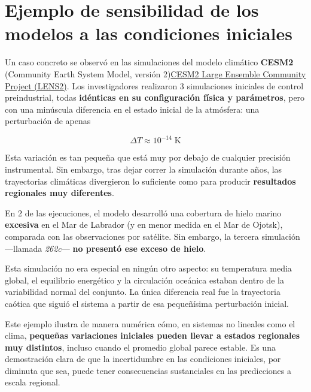 \documentclass[
  10pt,
  a4paper,
  DIV=11,
  numbers=noendperiod,
  open=any]{scrreprt}
\numberwithin{equation}{chapter}
\numberwithin{equation}{chapter}
\renewcommand{\[}{\begin{equation}}
\renewcommand{\]}{\end{equation}}
\begin{document}
\section{Ejemplo de sensibilidad de los modelos a las condiciones
iniciales}\label{ejemplo-de-sensibilidad-de-los-modelos-a-las-condiciones-iniciales}

Un caso concreto se observó en las simulaciones del modelo climático
\textbf{CESM2} (Community Earth System Model, versión
2)\href{https://www.cesm.ucar.edu/community-projects/lens2}{CESM2 Large
Ensemble Community Project (LENS2)}. Los investigadores realizaron 3
simulaciones iniciales de control preindustrial, todas \textbf{idénticas
en su configuración física y parámetros}, pero con una minúscula
diferencia en el estado inicial de la atmósfera: una perturbación de
apenas

\begin{equation}

\Delta T \approx 10^{-14} \; \text{K}

\end{equation}

Esta variación es tan pequeña que está muy por debajo de cualquier
precisión instrumental. Sin embargo, tras dejar correr la simulación
durante años, las trayectorias climáticas divergieron lo suficiente como
para producir \textbf{resultados regionales muy diferentes}.

En 2 de las ejecuciones, el modelo desarrolló una cobertura de hielo
marino \textbf{excesiva} en el Mar de Labrador (y en menor medida en el
Mar de Ojotsk), comparada con las observaciones por satélite. Sin
embargo, la tercera simulación ---llamada \emph{262c}--- \textbf{no
presentó ese exceso de hielo}.

Esta simulación no era especial en ningún otro aspecto: su temperatura
media global, el equilibrio energético y la circulación oceánica estaban
dentro de la variabilidad normal del conjunto. La única diferencia real
fue la trayectoria caótica que siguió el sistema a partir de esa
pequeñísima perturbación inicial.

Este ejemplo ilustra de manera numérica cómo, en sistemas no lineales
como el clima, \textbf{pequeñas variaciones iniciales pueden llevar a
estados regionales muy distintos}, incluso cuando el promedio global
parece estable. Es una demostración clara de que la incertidumbre en las
condiciones iniciales, por diminuta que sea, puede tener consecuencias
sustanciales en las predicciones a escala regional.
\end{document}
